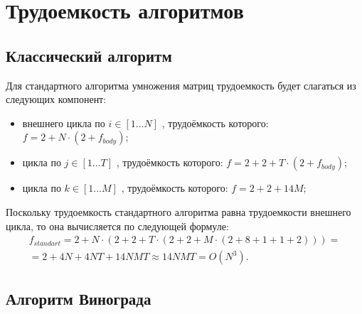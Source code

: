 \section{Трудоемкость алгоритмов}
\subsection{Классический алгоритм}

Для стандартного алгоритма умножения матриц трудоемкость будет слагаться из следующих компонент:

\begin{itemize}[label=---]
	\item внешнего цикла по $i \in [1 \ldots N]$ , трудоёмкость которого: $f = 2 + N \cdot (2 + f_{body})$;
	\item цикла по $j \in [1 \ldots T]$ , трудоёмкость которого: $f = 2 + 2 + T \cdot (2 + f_{body})$;
	\item цикла по $k \in [1 \ldots M]$ , трудоёмкость которого: $f = 2 + 2 + 14M$;
\end{itemize}

Поскольку трудоемкость стандартного алгоритма равна трудоемкости внешнего цикла, то она вычисляется по следующей формуле:
\begin{equation}
	\label{сomplexity:standart}
	\begin{gathered}
		f_{standart} = 2 + N \cdot (2 + 2 + T \cdot (2 + 2 + M \cdot (2 + 8 + 1 + 1 + 2)))= \\
		= 2 + 4N + 4NT + 14NMT \approx 14NMT = O(N^3).
	\end{gathered}
\end{equation}

\clearpage

\subsection{Алгоритм Винограда}

